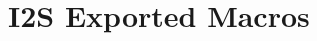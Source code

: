 \hypertarget{group___i2_s_ex___exported___macros}{}\section{I2S Exported Macros}
\label{group___i2_s_ex___exported___macros}

